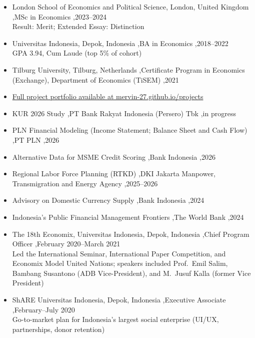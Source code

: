 \documentclass[letterpaper,10pt]{article}
\begin{document}

\begin{itemize}
\item London School of Economics and Political Science, London, United Kingdom \sep MSc in Economics \sep 2023--2024\\
Result: Merit; Extended Essay: Distinction
\item Universitas Indonesia, Depok, Indonesia \sep BA in Economics \sep 2018--2022\\
GPA 3.94, Cum Laude (top 5\% of cohort)
\item Tilburg University, Tilburg, Netherlands \sep Certificate Program in Economics (Exchange), Department of Economics (TiSEM) \sep 2021
\end{itemize}


\begin{itemize}
\item \href{https://mervin-27.github.io/projects/}{Full project portfolio available at mervin-27.github.io/projects}
\item KUR 2026 Study \sep PT Bank Rakyat Indonesia (Persero) Tbk \sep in progress
\item PLN Financial Modeling (Income Statement; Balance Sheet and Cash Flow) \sep PT PLN \sep 2026
\item Alternative Data for MSME Credit Scoring \sep Bank Indonesia \sep 2026
\item Regional Labor Force Planning (RTKD) \sep DKI Jakarta Manpower, Transmigration and Energy Agency \sep 2025--2026
\item Advisory on Domestic Currency Supply \sep Bank Indonesia \sep 2024
\item Indonesia's Public Financial Management Frontiers \sep The World Bank \sep 2024
\end{itemize}


\begin{itemize}
\item The 18th Economix, Universitas Indonesia, Depok, Indonesia \sep Chief Program Officer \sep February 2020--March 2021\\
Led the International Seminar, International Paper Competition, and Economix Model United Nations; speakers included Prof.\ Emil Salim, Bambang Susantono (ADB Vice-President), and M.\ Jusuf Kalla (former Vice President)
\item ShARE Universitas Indonesia, Depok, Indonesia \sep Executive Associate \sep February--July 2020\\
Go-to-market plan for Indonesia's largest social enterprise (UI/UX, partnerships, donor retention)
\end{itemize}
\end{document}
